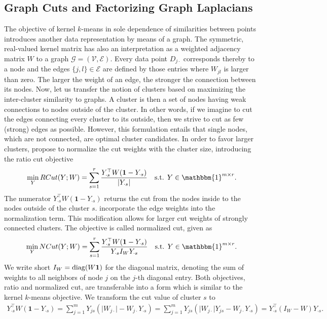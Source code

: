 \subsection{Graph Cuts and Factorizing Graph Laplacians} \label{sec:ZS:graphCut}
The objective of kernel $k$-means in sole dependence of similarities between points introduces another data representation by means of a graph. The symmetric, real-valued kernel matrix has also an interpretation as a weighted adjacency matrix $W$ to a graph $\mathcal{G}=(\mathcal{V},\mathcal{E})$. Every data point $D_{j\cdot}$ corresponds thereby to a node and the edges $\{j,l\}\in\mathcal{E}$ are defined by those entries where $W_{jl}$ is larger than zero. The larger the weight of an edge, the stronger the connection between its nodes. Now, let us transfer the notion of clusters based on maximizing the inter-cluster similarity to graphs. A cluster is then a set of nodes having weak connections to nodes outside of the cluster. In other words, if  we imagine to cut the edges connecting every cluster to its outside, then we strive to cut as few (strong) edges as possible. However, this formulation entails that single nodes, which are not connected, are optimal cluster candidates. In order to favor larger clusters, \cite{hagen1992new} propose to normalize the cut weights with the cluster size, introducing the ratio cut objective
\begin{align*}
\min_Y RCut(Y;W) &= \sum_{s=1}^r \frac{Y_{\cdot s}^\top W(\mathbf{1}-Y_{\cdot s})}{\lvert Y_{\cdot s}\rvert } & \text{s.t. } Y\in \mathbbm{1}^{m\times r}.
\end{align*}
The numerator $Y_{\cdot s}^\top W(\mathbf{1}-Y_{\cdot s})$ returns the cut from the nodes inside to the nodes outside of the cluster $s$.
\cite{shi2000normalized} incorporate the edge weights into the normalization term. This modification allows for larger cut weights of strongly connected clusters. The objective is called normalized cut, given as
\begin{align*}
\min_Y NCut(Y;W) &= \sum_{s=1}^r \frac{Y_{\cdot s}^\top W(\mathbf{1}-Y_{\cdot s})}{Y_{\cdot s}I_WY_{\cdot s}} & \text{s.t. } Y\in \mathbbm{1}^{m\times r}.
\end{align*}
We write short $I_W=\operatorname{diag}(W\mathbf{1})$ for the diagonal matrix, denoting the sum of weights to all neighbors of node $j$ on the $j$-th diagonal entry.
Both objectives, ratio and normalized cut, are transferable into a form which is similar to the kernel $k$-means objective. We transform the cut value of cluster $s$ to
\begin{align*}
	Y_{\cdot s}^\top W(\mathbf{1}-Y_{\cdot s})=\sum_{j=1}^m Y_{js}\left(\lvert W_{j\cdot}\rvert -W_{j\cdot}Y_{\cdot s}\right) =  \sum_{j=1}^m Y_{js}(\lvert W_{j\cdot}\rvert Y_{js}-W_{j\cdot}Y_{\cdot s}) = Y_{\cdot s}^\top (I_W-W)Y_{\cdot s}.
\end{align*}
